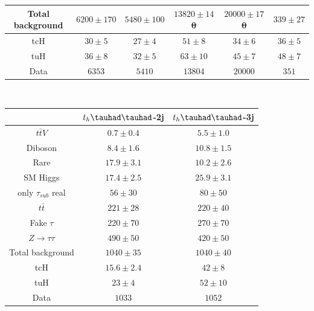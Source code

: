 \documentclass[PAPER, coverpage, atlasdraft=true, texlive=2016, UKenglish]{\ATLASLATEXPATH atlasdoc}
\providecommand{\DIFadd}[1]{{\protect\color{blue}\uwave{#1}}} %
\providecommand{\DIFdel}[1]{{\protect\color{red}\sout{#1}}}                      %
\providecommand{\DIFaddFL}[1]{\DIFadd{#1}} %
\providecommand{\DIFdelFL}[1]{\DIFdel{#1}} %
\providecommand{\DIFaddbeginFL}{} %
\providecommand{\DIFaddendFL}{} %
\providecommand{\DIFdelbeginFL}{} %
\providecommand{\DIFdelendFL}{} %
\begin{document}
\begin{table}[htbp]
\begin{tabular}{cccccc}
  Total background       & $6200 \pm 170$  & $5480 \pm 100$  & \DIFdelbeginFL \DIFdelFL{$13820 \pm 14$0 }\DIFdelendFL \DIFaddbeginFL \DIFaddFL{$13820 \pm 140$ }\DIFaddendFL &  \DIFdelbeginFL \DIFdelFL{$20000 \pm 17$0 }\DIFdelendFL \DIFaddbeginFL \DIFaddFL{$20000 \pm 170$ }\DIFaddendFL & $339 \pm 27   $ \\  \midrule
  tcH                    & $30 \pm 5    $  & $27 \pm 4    $  & $51 \pm 8    $  &  $34 \pm 6    $  & $36 \pm 5     $ \\
  tuH                    & $36 \pm 8    $  & $32 \pm 5    $  & $63 \pm 10   $  &  $45 \pm 7    $  & $48 \pm 7     $ \\ \midrule
  Data                   & $6353        $  & $5410        $  & $13804       $  &  $20000       $  & $351          $ \\ 
\bottomrule\bottomrule
\end{tabular}\\




\begin{tabular}{ccc} \toprule\toprule
& $t_{h}\thadhad$-2j & $t_{h}\thadhad$-3j\\\midrule
  $t\bar{t}V$              & $0.7 \pm 0.4 $ & $5.5 \pm 1.0 $  \\
  Diboson                  & $8.4 \pm 1.6 $ & $10.8 \pm 1.5$  \\
  Rare                     & $17.9 \pm 3.1$ & $10.2 \pm 2.6$  \\ 
  SM Higgs                 & $17.4 \pm 2.5$ & $25.9 \pm 3.1$  \\ 
  only $\tau_{sub}$ real   & $56 \pm 30   $ & $80 \pm 50   $  \\  
  $t\bar{t}$               & $221 \pm 28  $ & $220 \pm 40  $  \\
  Fake $\tau$              & $220 \pm 70  $ & $270 \pm 70  $  \\  
  $Z\rightarrow\tau\tau$   & $490 \pm 50  $ & $420 \pm 50  $  \\ 
  Total background         & $1040 \pm 35 $ & $1040 \pm 40 $  \\ \midrule
  tcH                      & \DIFdelbeginFL \DIFdelFL{$15.6 \pm 2.4$ }\DIFdelendFL \DIFaddbeginFL \DIFaddFL{$15.6 \pm 2.5$ }\DIFaddendFL & $42 \pm 8    $  \\ 
  tuH                      & $23 \pm 4    $ & $52 \pm 10   $  \\ \midrule
  Data                     & $1033       $& $1052 $       \\
\bottomrule\bottomrule
\end{tabular}
\label{tab:HtautauPostfitYieldsUnblind}
\end{table}
\end{document}
